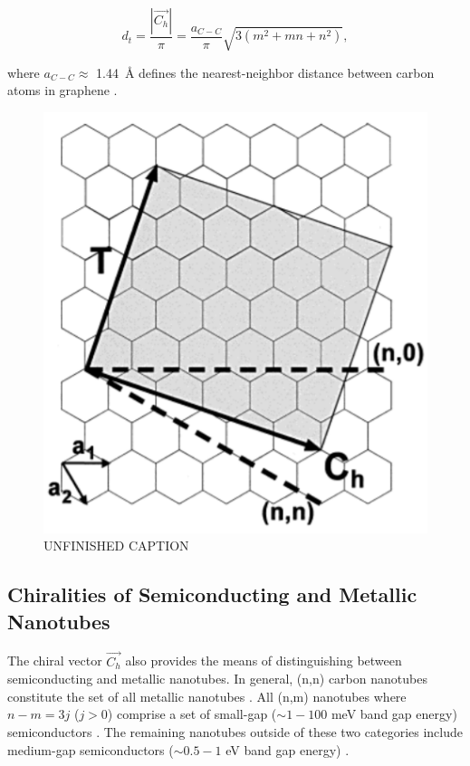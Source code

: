 \begin{equation}
	d_t = \dfrac{|\vec{C_h}|}{\pi} = \dfrac{a_{C-C}}{\pi}\sqrt{3(m^2 + mn + n^2)},
\end{equation} 

where $a_{C-C} \approx$ \SI{1.44}{\angstrom} defines the nearest-neighbor distance between carbon atoms in graphene \cite{nanot2013single}.  

\begin{figure}[H]
	\centering
	\includegraphics[scale=1]{images/chapter_optical_props/chiral_vectors_sheet.png}
	\caption{{\color{red}UNFINISHED CAPTION}}
	\label{fig:chiral_vectors}
\end{figure}

\subsection{Chiralities of Semiconducting and Metallic Nanotubes}
The chiral vector $\vec{C_h}$ also provides the means of distinguishing between semiconducting and metallic nanotubes. In general, (n,n) carbon nanotubes constitute the set of all metallic nanotubes \cite{nanot2012optoelectronic}. All (n,m) nanotubes where $n-m = 3j$ ($j > 0$) comprise a set of small-gap ($\sim1 - 100$ meV band gap energy) semiconductors \cite{nanot2012optoelectronic}. The remaining nanotubes outside of these two categories include medium-gap semiconductors ($\sim0.5 - 1$ eV band gap energy) \cite{nanot2012optoelectronic}.


